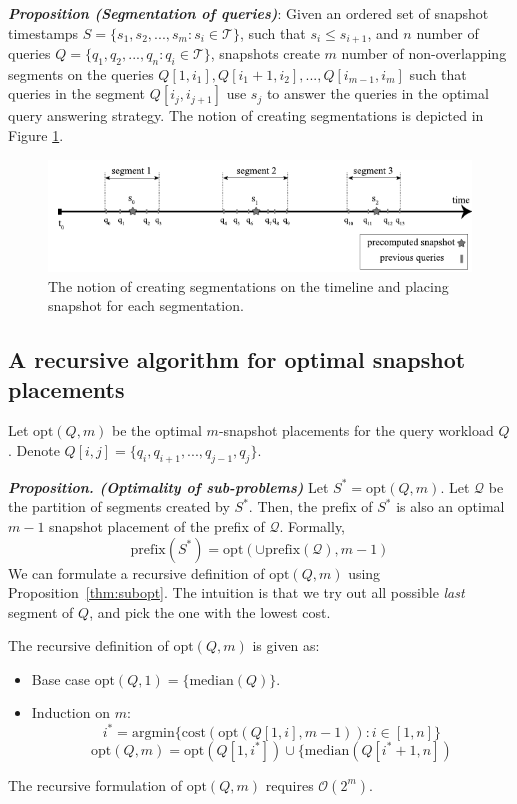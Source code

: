 \textbf{\emph{Proposition (Segmentation of queries)}}: Given an ordered set of snapshot timestamps $S=\{s_1,s_2,...,s_m:s_i \in \mathcal{T}\}$, such that $s_i \leq s_{i+1}$, and $n$ number of queries $Q = \{q_1,q_2,...,q_n: q_i \in \mathcal{T}\}$, snapshots create $m$ number of non-overlapping segments on the queries $Q[1,i_1],Q[i_1+1,i_2],...,Q[i_{m-1},i_m]$ such that queries in the segment $Q[i_j,i_{j+1}]$ use $s_j$ to answer the queries in the optimal query answering strategy. The notion of creating segmentations is depicted in Figure \ref{fig:segmentation}.

\begin{figure}
	\centering
	\includegraphics[width=\textwidth]{figs/segmentations.pdf}
	\caption{The notion of creating segmentations on the timeline and placing snapshot for each segmentation.}
	\label{fig:segmentation}
\end{figure}

\subsection{A recursive algorithm for optimal snapshot placements}

Let $\mathrm{opt}(Q, m)$ be the optimal $m$-snapshot placements for the query workload $Q$. Denote $Q[i,j] = \{q_i,q_{i+1},...,q_{j-1},q_j\}$.

\textbf{\emph{Proposition. (Optimality of sub-problems)}}
Let $S^* = \mathrm{opt}(Q, m)$.  Let $\mathcal{Q}$ be the partition of segments created by $S^*$.  Then, the prefix of $S^*$ is also an optimal $m-1$ snapshot placement of the prefix of $\mathcal{Q}$. Formally, $$\mathrm{prefix}(S^*) = \mathrm{opt}(\cup\mathrm{prefix}(\mathcal{Q}), m-1)$$
We can formulate a recursive definition of $\mathrm{opt}(Q, m)$ using
Proposition~\ref{thm:subopt}.  The intuition is that we try out all possible
{\em last} segment of $Q$, and pick the one with the lowest cost.

The recursive definition of $\mathrm{opt}(Q, m)$ is given as:

\begin{itemize}
	\item Base case $ \mathrm{opt}(Q, 1) = \{\mathrm{median}(Q)\}$.
	\item Induction on $m$:
	$$i^* = \mathrm{argmin}\{\mathrm{cost}(\mathrm{opt}(Q[1,i], m-1)): i\in[1,
	n]\}$$
	$$
	\mathrm{opt}(Q, m) = \mathrm{opt}(Q[1, i^*]) \cup \{\mathrm{median}(Q[i^*+1, n])
	$$
\end{itemize}
The recursive formulation of $\mathrm{opt}(Q, m)$ requires $\mathcal{O}(2^{m})$.

